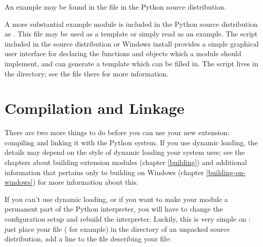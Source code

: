 An example may be found in the file  in the
Python source distribution.


A more substantial example module is included in the Python source
distribution as .  This file may be used as a 
template or simply read as an example.  The 
script included in the source distribution or Windows install provides 
a simple graphical user interface for declaring the functions and
objects which a module should implement, and can generate a template
which can be filled in.  The script lives in the
 directory; see the  file there
for more information.


\section{Compilation and Linkage
         \label{compilation}}

There are two more things to do before you can use your new extension:
compiling and linking it with the Python system.  If you use dynamic
loading, the details may depend on the style of dynamic loading your
system uses; see the chapters about building extension modules
(chapter \ref{building}) and additional information that pertains only
to building on Windows (chapter \ref{building-on-windows}) for more
information about this.

If you can't use dynamic loading, or if you want to make your module a
permanent part of the Python interpreter, you will have to change the
configuration setup and rebuild the interpreter.  Luckily, this is
very simple on \UNIX: just place your file ( for
example) in the  directory of an unpacked source
distribution, add a line to the file 
describing your file:

